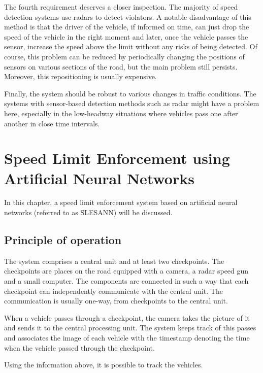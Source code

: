 \documentclass[times, utf8, zavrsni]{fer}
\begin{document}
The fourth requirement deserves a closer inspection. The majority of speed
detection systems use radars to detect violators. A notable disadvantage of
this method is that the driver of the vehicle, if informed on time, can just
drop the speed of the vehicle in the right moment and later, once the vehicle
passes the sensor, increase the speed above the limit without any risks of being
detected. Of course, this problem can be reduced by periodically changing the
positions of sensors on various sections of the road, but the main problem still
persists. Moreover, this repositioning is usually expensive. 

Finally, the system should be robust to various changes in traffic conditions.
The systems with sensor-based detection methods such as radar might have a
problem here, especially in the low-headway situations where vehicles pass one
after another in close time intervals.

\chapter{Speed Limit Enforcement using Artificial Neural Networks}

In this chapter, a speed limit enforcement system based on artificial neural
networks (referred to as SLESANN) will be discussed.

\section{Principle of operation}

The system comprises a central unit and at least two checkpoints. The
checkpoints are places on the road equipped with a camera, a radar speed gun and
a small computer. The components are connected in such a way that each 
checkpoint can independently communicate with the central unit. 
The communication is usually one-way, from checkpoints to the central unit.

When a vehicle passes through a checkpoint, the camera takes the picture of it
and sends it to the central processing unit. The system keeps track of this
passes and associates the image of each vehicle with the timestamp denoting the
time when the vehicle passed through the checkpoint.

Using the information above, it is possible to track the vehicles. 
\end{document}
